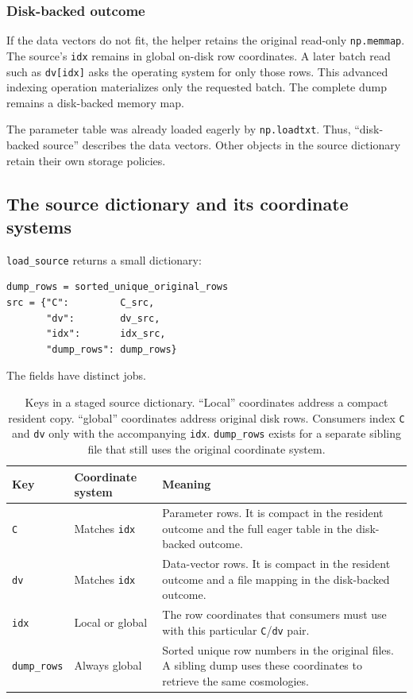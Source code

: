 \documentclass[10pt,aps,prd,twocolumn,nofootinbib]{revtex4-2}
\newcommand{\code}[1]{\texttt{#1}}
\begin{document}
\subsubsection{Disk-backed outcome}

If the data vectors do not fit, the helper retains the original read-only
\code{np.memmap}.  The source's \code{idx} remains in global on-disk row
coordinates.  A later batch read such as \code{dv[idx]} asks the operating
system for only those rows.  This advanced indexing operation materializes
only the requested batch.  The complete dump remains a disk-backed memory
map.

The parameter table was already loaded eagerly by \code{np.loadtxt}.  Thus,
``disk-backed source'' describes the data vectors.  Other objects in the
source dictionary retain their own storage policies.

\subsection{The source dictionary and its coordinate systems}

\code{load\_source} returns a small dictionary:
\begin{verbatim}
dump_rows = sorted_unique_original_rows
src = {"C":         C_src,
       "dv":        dv_src,
       "idx":       idx_src,
       "dump_rows": dump_rows}
\end{verbatim}

The fields have distinct jobs.

\begin{table}[t]
\centering
\begin{tabular}{p{}p{}p{}}
\toprule
Key & Coordinate system & Meaning \\
\midrule
\code{C}
  & Matches \code{idx}
  & Parameter rows.  It is compact in the resident outcome and the full
    eager table in the disk-backed outcome.  \\
\code{dv}
  & Matches \code{idx}
  & Data-vector rows.  It is compact in the resident outcome and a file
    mapping in the disk-backed outcome.  \\
\code{idx}
  & Local or global
  & The row coordinates that consumers must use with this particular
    \code{C}/\code{dv} pair.  \\
\code{dump\_rows}
  & Always global
  & Sorted unique row numbers in the original files.  A sibling dump uses
    these coordinates to retrieve the same cosmologies.  \\
\bottomrule
\end{tabular}
\caption{Keys in a staged source dictionary.  ``Local'' coordinates address a
compact resident copy. ``global'' coordinates address original disk rows.
Consumers index \code{C} and \code{dv} only with the accompanying \code{idx}.
\code{dump\_rows} exists for a separate sibling file that still uses the
original coordinate system.}
\label{tab:source-dictionary}
\end{table}
\end{document}
